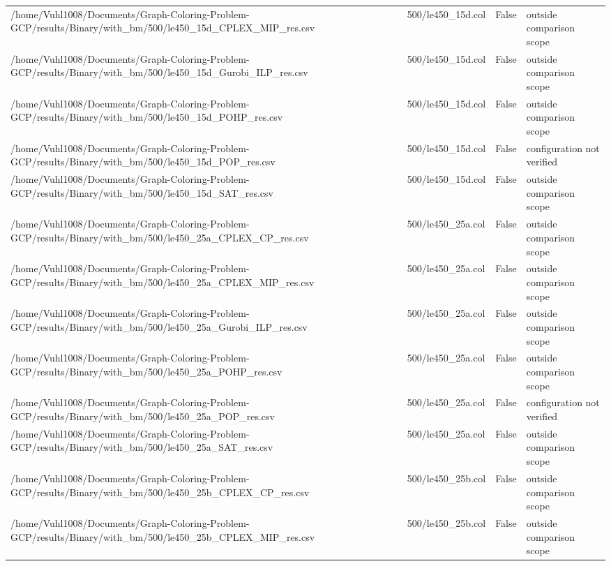 \begin{table}[htbp]
\begin{tabular}{llll}
/home/Vuhl1008/Documents/Graph-Coloring-Problem-GCP/results/Binary/with\_bm/500/le450\_15d\_CPLEX\_MIP\_res.csv & 500/le450\_15d.col & False & outside comparison scope \\
/home/Vuhl1008/Documents/Graph-Coloring-Problem-GCP/results/Binary/with\_bm/500/le450\_15d\_Gurobi\_ILP\_res.csv & 500/le450\_15d.col & False & outside comparison scope \\
/home/Vuhl1008/Documents/Graph-Coloring-Problem-GCP/results/Binary/with\_bm/500/le450\_15d\_POHP\_res.csv & 500/le450\_15d.col & False & outside comparison scope \\
/home/Vuhl1008/Documents/Graph-Coloring-Problem-GCP/results/Binary/with\_bm/500/le450\_15d\_POP\_res.csv & 500/le450\_15d.col & False & configuration not verified \\
/home/Vuhl1008/Documents/Graph-Coloring-Problem-GCP/results/Binary/with\_bm/500/le450\_15d\_SAT\_res.csv & 500/le450\_15d.col & False & outside comparison scope \\
/home/Vuhl1008/Documents/Graph-Coloring-Problem-GCP/results/Binary/with\_bm/500/le450\_25a\_CPLEX\_CP\_res.csv & 500/le450\_25a.col & False & outside comparison scope \\
/home/Vuhl1008/Documents/Graph-Coloring-Problem-GCP/results/Binary/with\_bm/500/le450\_25a\_CPLEX\_MIP\_res.csv & 500/le450\_25a.col & False & outside comparison scope \\
/home/Vuhl1008/Documents/Graph-Coloring-Problem-GCP/results/Binary/with\_bm/500/le450\_25a\_Gurobi\_ILP\_res.csv & 500/le450\_25a.col & False & outside comparison scope \\
/home/Vuhl1008/Documents/Graph-Coloring-Problem-GCP/results/Binary/with\_bm/500/le450\_25a\_POHP\_res.csv & 500/le450\_25a.col & False & outside comparison scope \\
/home/Vuhl1008/Documents/Graph-Coloring-Problem-GCP/results/Binary/with\_bm/500/le450\_25a\_POP\_res.csv & 500/le450\_25a.col & False & configuration not verified \\
/home/Vuhl1008/Documents/Graph-Coloring-Problem-GCP/results/Binary/with\_bm/500/le450\_25a\_SAT\_res.csv & 500/le450\_25a.col & False & outside comparison scope \\
/home/Vuhl1008/Documents/Graph-Coloring-Problem-GCP/results/Binary/with\_bm/500/le450\_25b\_CPLEX\_CP\_res.csv & 500/le450\_25b.col & False & outside comparison scope \\
/home/Vuhl1008/Documents/Graph-Coloring-Problem-GCP/results/Binary/with\_bm/500/le450\_25b\_CPLEX\_MIP\_res.csv & 500/le450\_25b.col & False & outside comparison scope \\

\end{tabular}
\end{table}
